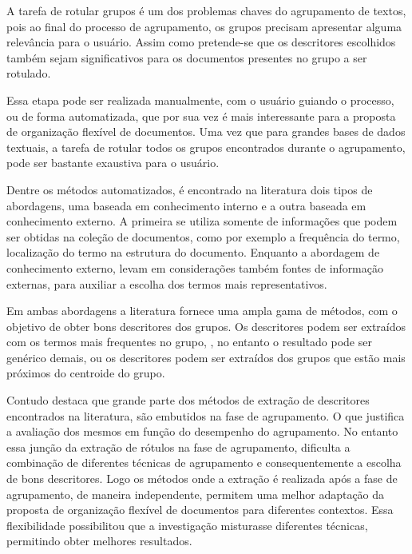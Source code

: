 A tarefa de rotular grupos é um dos problemas chaves do agrupamento de textos, pois ao final do
processo de agrupamento, os grupos precisam apresentar alguma relevância para o
usuário\cite{Zhang2008}. Assim como pretende-se que os descritores escolhidos também sejam
significativos para os documentos presentes no grupo a ser rotulado. 

Essa etapa pode ser realizada manualmente, com o usuário guiando o processo, ou de forma
automatizada, que por sua vez é mais interessante para a proposta de organização flexível de
documentos. Uma vez que para grandes bases de dados textuais, a tarefa de rotular todos os grupos
encontrados durante o agrupamento, pode ser bastante exaustiva para o usuário.

Dentre os métodos automatizados, é encontrado na literatura dois tipos de abordagens, uma baseada em
conhecimento interno e a outra baseada em conhecimento externo\cite{Nogueira2013}.  A primeira se
utiliza somente de informações que podem ser obtidas na coleção de documentos, como por exemplo a
frequência do termo, localização do termo na estrutura do documento.  Enquanto a abordagem de
conhecimento externo, levam em considerações também fontes de informação externas, para auxiliar a
escolha dos termos mais representativos. 

Em ambas abordagens a literatura fornece uma ampla gama de métodos, com o objetivo de obter bons
descritores dos grupos. Os descritores podem ser extraídos com os termos mais frequentes no grupo, ,
no entanto o resultado pode ser genérico demais\cite{Pucktada2006}, ou os descritores podem ser
extraídos dos grupos que estão mais próximos do centroide do grupo.

Contudo \cite{Nogueira2013} destaca que grande parte dos métodos de extração de descritores
encontrados na literatura, são embutidos na fase de agrupamento. O que justifica a avaliação dos
mesmos em função do desempenho do agrupamento. No entanto essa junção da extração de rótulos na fase
de agrupamento, dificulta a combinação de diferentes técnicas de agrupamento e consequentemente a
escolha de bons descritores. Logo os métodos onde a extração é realizada após a fase de agrupamento,
de maneira independente, permitem uma melhor adaptação da proposta de organização flexível de
documentos para diferentes contextos. Essa flexibilidade possibilitou que a investigação misturasse
diferentes técnicas, permitindo obter melhores resultados.





